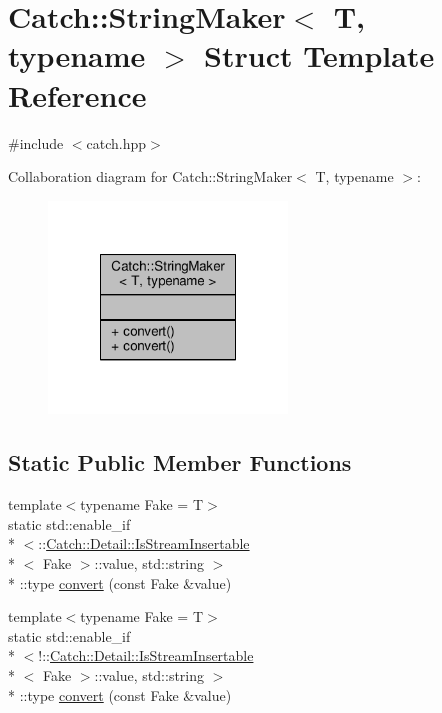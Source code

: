 \hypertarget{struct_catch_1_1_string_maker}{\section{Catch\-:\-:String\-Maker$<$ T, typename $>$ Struct Template Reference}
\label{struct_catch_1_1_string_maker}
}


{\ttfamily \#include $<$catch.\-hpp$>$}



Collaboration diagram for Catch\-:\-:String\-Maker$<$ T, typename $>$\-:
\nopagebreak
\begin{figure}[H]
\begin{center}
\leavevmode
\includegraphics[width=180pt]{struct_catch_1_1_string_maker__coll__graph}
\end{center}
\end{figure}
\subsection*{Static Public Member Functions}
\begin{DoxyCompactItemize}
\item 
{\footnotesize template$<$typename Fake  = T$>$ }\\static std\-::enable\-\_\-if\\*
$<$\-::\hyperlink{class_catch_1_1_detail_1_1_is_stream_insertable}{Catch\-::\-Detail\-::\-Is\-Stream\-Insertable}\\*
$<$ Fake $>$\-::value, std\-::string $>$\\*
\-::type \hyperlink{struct_catch_1_1_string_maker_ab2c357e22b754802c4b1351257103eb6}{convert} (const Fake \&value)
\item 
{\footnotesize template$<$typename Fake  = T$>$ }\\static std\-::enable\-\_\-if\\*
$<$!\-::\hyperlink{class_catch_1_1_detail_1_1_is_stream_insertable}{Catch\-::\-Detail\-::\-Is\-Stream\-Insertable}\\*
$<$ Fake $>$\-::value, std\-::string $>$\\*
\-::type \hyperlink{struct_catch_1_1_string_maker_a68bb548de0e5ad364228b1ca3dd2f561}{convert} (const Fake \&value)
\end{DoxyCompactItemize}


